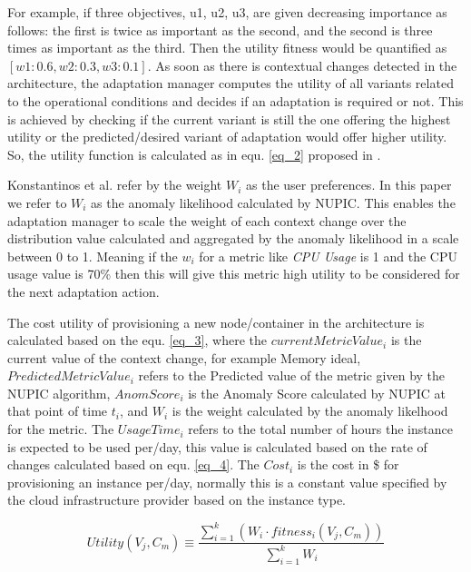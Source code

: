 \documentclass[sigconf]{acmart}
\begin{document}
For example, if three objectives, u1, u2, u3, are given decreasing importance as follows: the first is twice as important as the second, and the second is three times as important as the third. Then the utility fitness would be quantified as $[w1 : 0.6, w2 : 0.3, w3 : 0.1]$. 
As soon as there is contextual changes detected in the architecture, the adaptation manager computes the utility of all variants related to the operational conditions and decides if an adaptation is required or not. This is achieved by checking if the current variant is still the one offering the highest utility or the predicted/desired variant of adaptation would offer higher utility. So, the utility function is calculated as in equ. \ref{eq_2} proposed in \cite{KonstantinosKakousis:2008ub}. 

Konstantinos et al. \cite{KonstantinosKakousis:2008ub} refer by the weight $W_{i}$ as the user preferences. In this paper we refer to $W_{i}$ as the anomaly likelihood calculated by NUPIC. This enables the adaptation manager to scale the weight of each context change over the distribution value calculated and aggregated by the anomaly likelihood in a scale between 0 to 1. Meaning if the $w_{i}$ for a metric like \textit{CPU Usage} is 1 and the CPU usage value is 70\% then this will give this metric high utility to be considered for the next adaptation action. 

The cost utility of provisioning a new node/container in the architecture is calculated based on the equ. \ref{eq_3}, where the $currentMetricValue_{i}$ is the current value of the context change, for example Memory ideal, $PredictedMetricValue_{i}$ refers to the Predicted value of the metric given by the NUPIC algorithm, $AnomScore_{i}$ is the Anomaly Score calculated by NUPIC at that point of time $t_{i}$, and $W_{i}$ is the weight calculated by the anomaly likelhood for the metric. The $UsageTime_{i}$ refers to the total number of hours the instance is expected to be used per/day, this value is calculated based on the rate of changes calculated based on equ. \ref{eq_4}. The $Cost_{i}$ is the cost in \$ for provisioning an instance per/day, normally this is a constant value specified by the cloud infrastructure provider based on the instance type.

\begin{equation}
\label{eq_2}
    Utility(V_{j},C_{m}) \equiv \frac{ \sum_{i=1}^{k} (W_{i} \cdot fitness_{i}(V_{j},C_{m}) ) }{\sum_{i=1}^{k} W_{i}}
\end{equation}
\end{document}
